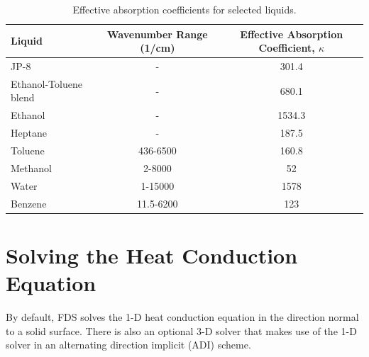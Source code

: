 \begin{table}[ht]
\caption[Effective absorption coefficients for selected liquids]{Effective absorption coefficients for selected liquids.}
\centering
\begin{tabular}{l c c}
\hline\hline
Liquid                                              & Wavenumber Range (\unit{1/\cm})  & Effective Absorption Coefficient, $\kappa$    \\ \hline
JP-8 \cite{Suo-Anttila:PCT2009}                     &  -                             & 301.4                                         \\
Ethanol-Toluene blend \cite{Suo-Anttila:PCT2009}    &  -                             & 680.1                                         \\
Ethanol \cite{Suo-Anttila:PCT2009}                  &  -                             & 1534.3                                        \\
Heptane \cite{Suo-Anttila:PCT2009}                  &  -                             & 187.5                                         \\
Toluene \cite{Bertie:AS1994a}                       &  436-6500                      & 160.8                                         \\
Methanol\cite{Bertie:AS1993a}                       &  2-8000                        & 52                                            \\
Water   \cite{Bertie:AS1996}                        &  1-15000                       & 1578                                          \\
Benzene \cite{Bertie:AS1993b}                       &  11.5-6200                     & 123                                           \\ \hline
\end{tabular}
\label{tbl_abscoeff}
\end{table}




\chapter{Solving the Heat Conduction Equation}
\label{solid-phase-discretization}

By default, FDS solves the 1-D heat conduction equation in the direction normal to a solid surface. There is also an optional 3-D solver that makes use of the 1-D solver in an alternating direction implicit (ADI) scheme.


